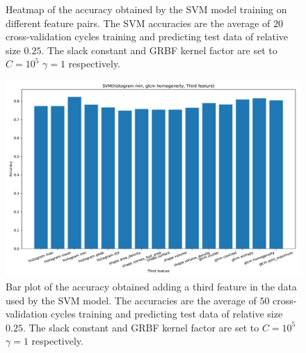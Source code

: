 \begin{figure}[H]
\centering
{}
\caption{Heatmap of the accuracy obtained by the SVM model training on different feature pairs. The SVM accuracies are the average 
of $20$ cross-validation cycles training and predicting test data of relative size $0.25$.
The slack constant and GRBF kernel factor are set to $C=10^5$  $\gamma=1 $ respectively. }
\label{fig:Figures-feature_pairs0}
\end{figure}

\begin{figure}[H]
\centering
\includegraphics[width=1\textwidth]{Figures/third_feature0}
\caption{Bar plot of the accuracy obtained adding a third feature in the data used 
by the SVM model. The accuracies are the average 
of $50$ cross-validation cycles training and predicting test data of relative size $0.25$.
The slack constant and GRBF kernel factor are set to $C=10^5$  $\gamma=1 $ respectively. }
\label{fig:Figures-third_feature0}
\end{figure}

